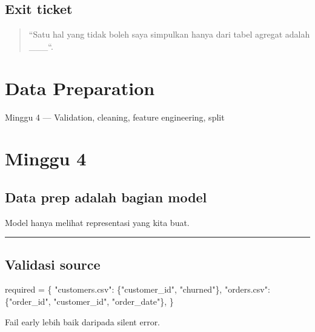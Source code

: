 \documentclass[
  indonesian,
  letterpaper,
  DIV=11,
  numbers=noendperiod]{scrreprt}
\newenvironment{Shaded}{\begin{snugshade}}{\end{snugshade}}
\newcommand{\NormalTok}[1]{\textcolor[rgb]{0.00,0.23,0.31}{#1}}
\newcommand{\OperatorTok}[1]{\textcolor[rgb]{0.37,0.37,0.37}{#1}}
\newcommand{\StringTok}[1]{\textcolor[rgb]{0.13,0.47,0.30}{#1}}
\begin{document}
\section{Exit ticket}\label{exit-ticket-1}

\begin{quote}
``Satu hal yang tidak boleh saya simpulkan hanya dari tabel agregat
adalah \_\_\_``.
\end{quote}

\chapter{Data Preparation}\label{data-preparation}

Minggu 4 --- Validation, cleaning, feature engineering, split

\hfill\break

\chapter{Minggu 4}\label{minggu-4}

\section{Data prep adalah bagian
model}\label{data-prep-adalah-bagian-model}

Model hanya melihat representasi yang kita buat.

\begin{center}\rule{0.5\linewidth}{0.5pt}\end{center}

\section{Validasi source}\label{validasi-source}

\begin{Shaded}
\begin{Highlighting}[]
\NormalTok{required }\OperatorTok{=}\NormalTok{ \{}
    \StringTok{"customers.csv"}\NormalTok{: \{}\StringTok{"customer\_id"}\NormalTok{, }\StringTok{"churned"}\NormalTok{\},}
    \StringTok{"orders.csv"}\NormalTok{: \{}\StringTok{"order\_id"}\NormalTok{, }\StringTok{"customer\_id"}\NormalTok{, }\StringTok{"order\_date"}\NormalTok{\},}
\NormalTok{\}}
\end{Highlighting}
\end{Shaded}

Fail early lebih baik daripada silent error.
\end{document}
